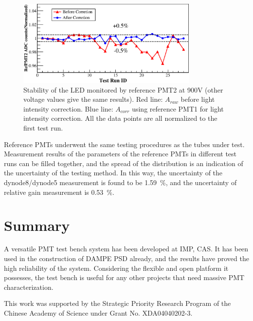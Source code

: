 \documentclass{JINST}
\begin{document}
\begin{figure}[tbp]
	\centering
	\includegraphics[width=90mm]{FIG8}
	\caption{Stability of the LED monitored by reference PMT2 at 900V (other voltage values give the same results). Red line: $A_{raw}$ before light intensity correction. Blue line: $A_{corr}$ using reference PMT1 for light intensity correction. All the data points are all normalized to the first test run. }
	\label{fig:FIG8}
\end{figure} 
	
Reference PMTs underwent the same testing procedures as the tubes under test.
Measurement results of the parameters of the reference PMTs in different test runs can be filled together, and the spread of the distribution is an indication of the uncertainty of the testing method.
In this way, the uncertainty of the dynode8/dynode5 measurement is found to be \SI{1.59}{\percent}, and the uncertainty of relative gain measurement is \SI{0.53}{\percent}. 
	
\section{Summary}
\label{sec:summary}
A versatile PMT test bench system has been developed at IMP, CAS.
It has been used in the construction of DAMPE PSD already, and the results have proved the high reliability of the system.
Considering the flexible and open platform it possesses, the test bench is useful for any other projects that need massive PMT characterization. 

\acknowledgments

This work was supported by the Strategic Priority Research Program of the Chinese Academy of Science under Grant No. XDA04040202-3.



\end{document}
